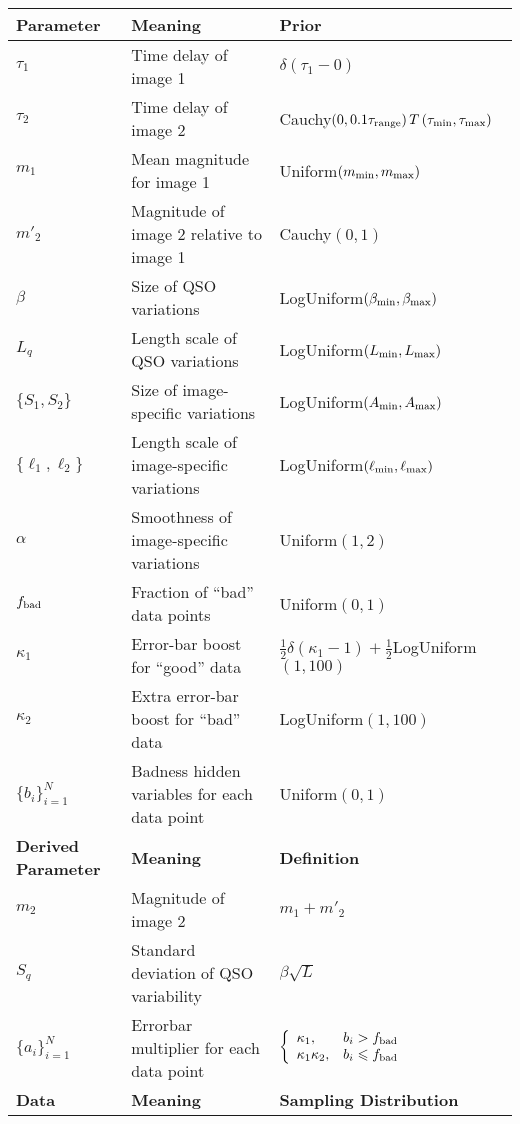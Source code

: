 \documentclass[useAMS,usenatbib, a4paper]{mn2e} \usepackage{natbib}
\begin{document}
\begin{table*}
\begin{tabular}{lll}
\hline
{\bf Parameter} &	{\bf Meaning}			& {\bf Prior}\\
\hline
$\tau_1$	&	Time delay of image 1	&	$\delta(\tau_1 - 0)$\\
$\tau_2$	&	Time delay of image 2	&	Cauchy$\left(0, 0.1\tau_{\rm range}\right)T\left(\tau_{\rm min},\tau_{\rm max}\right)$\\
$m_1$	&	Mean magnitude for image 1	& Uniform$(m_{\rm min}, m_{\rm max})$\\
$m'_2$		&	Magnitude of image 2 relative to image 1	& Cauchy$(0,1)$\\
$\beta$		&	Size of QSO variations		& LogUniform$(\beta_{\rm min}, \beta_{\rm max})$\\
$L_q$		&	Length scale of QSO variations	& LogUniform$(L_{\rm min}, L_{\rm max})$\\
$\{S_1, S_2\}$	&	Size of image-specific variations	& LogUniform$\left(A_{\rm min}, A_{\rm max}\right)$\\
$\{\ell_1, \ell_2\}$ &	Length scale of image-specific variations & LogUniform$(\ell_{\rm min}, \ell_{\rm max})$\\
$\alpha$	&	Smoothness of image-specific variations	& Uniform$(1, 2)$\\
$f_{\rm bad}$	&	Fraction of ``bad'' data points	& Uniform$(0,1)$\\
$\kappa_1$	&	Error-bar boost for ``good'' data & $\frac{1}{2}\delta(\kappa_1 - 1) + \frac{1}{2}$LogUniform$(1,100)$\\
$\kappa_2$	&	Extra error-bar boost for ``bad'' data & LogUniform$(1, 100)$\\
$\{b_i\}_{i=1}^N$ &	Badness hidden variables for each data point & Uniform$(0,1)$\\
\hline
{\bf Derived Parameter} & {\bf Meaning}	&	{\bf Definition}\\
\hline
$m_2$	&	Magnitude of image 2	& $m_1 + m'_2$\\
$S_{q}$	&	Standard deviation of QSO variability	& $\beta\sqrt{L}$\\
$\{a_i\}_{i=1}^N$	&	Errorbar multiplier for each data point & $\left\{\begin{array}{lr}\kappa_1, & b_i > f_{\rm bad}\\ \kappa_1\kappa_2, & b_i \leq f_{\rm bad}\end{array}\right.$\\
\hline
{\bf Data}	&	{\bf Meaning}			& {\bf Sampling Distribution}\\

\end{tabular}
\end{table*}
\end{document}
